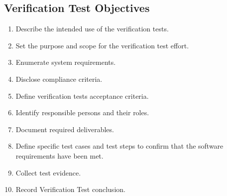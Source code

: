 \subsection{Verification Test Objectives}
\begin{enumerate}
  \item Describe the intended use of the verification tests.
  \item Set the purpose and scope for the verification test effort.
  \item Enumerate system requirements.
  \item Disclose compliance criteria.
  \item Define verification tests acceptance criteria.
  \item Identify responsible persons and their roles.
  \item Document required deliverables.
  \item Define specific test cases and test steps to confirm that the software
    requirements have been met.
  \item Collect test evidence.
  \item Record Verification Test conclusion.
\end{enumerate}


